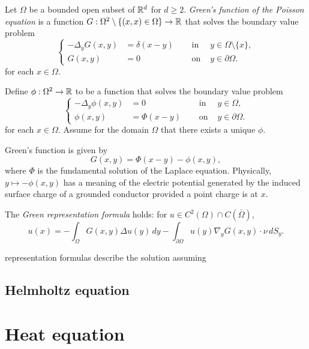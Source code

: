 \documentclass{../note}
\begin{document}
\begin{prb}
Let $\Omega$ be a bounded open subset of $\mathbb{R}^d$ for $d\ge2$.
\emph{Green's function of the Poisson equation} is a function $G:\Omega^2\setminus\{(x,x)\in\Omega\}\to\mathbb{R}$ that solves the boundary value problem
\[\left\{\begin{alignedat}{2}
-\Delta_yG(x,y)&=\delta(x-y)\quad & \text{ in }&y\in\Omega\setminus\{x\},\\
G(x,y)&=0 & \text{ on }&y\in\partial\Omega.
\end{alignedat}\right.\]
for each $x\in\Omega$.

Define $\phi:\Omega^2\to\mathbb{R}$ to be a function that solves the boundary value problem
\[\left\{\begin{alignedat}{2}
-\Delta_y\phi(x,y)&=0 & \text{ in }&y\in\Omega,\\
\phi(x,y)&=\Phi(x-y)\quad & \text{ on }&y\in\partial\Omega.
\end{alignedat}\right.\]
for each $x\in\Omega$.
Assume for the domain $\Omega$ that there exists a unique $\phi$.
\begin{parts}
\item Green's function is given by
\[G(x,y)=\Phi(x-y)-\phi(x,y),\]
where $\Phi$ is the fundamental solution of the Laplace equation.
Physically, $y\mapsto-\phi(x,y)$ has a meaning of the electric potential generated by the induced surface charge of a grounded conductor provided a point charge is at $x$.
\item The \emph{Green representation formula} holds: for $u\in C^2(\Omega)\cap C(\bar\Omega)$,
\[u(x)=-\int_\Omega G(x,y)\Delta u(y)\,dy-\int_{\partial\Omega}u(y)\nabla_yG(x,y)\cdot\nu\,dS_y.\]
\end{parts}
\end{prb}

\begin{prb}
representation formulas describe the solution assuming 

\end{prb}

\section{Helmholtz equation}






\chapter{Heat equation}
\end{document}
